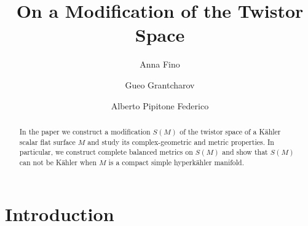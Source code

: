 \documentclass[11pt]{amsart}
\title{On a  Modification of the Twistor Space}
\theoremstyle{definition}
\theoremstyle{plain}
\theoremstyle{definition}
\theoremstyle{plain}
\theoremstyle{remark}
\theoremstyle{plain}
\begin{document}
\author{Anna Fino}
\address[Anna Fino]{Dipartimento di Matematica ``G. Peano'', Universit\`{a} degli studi di Torino \\
Via Carlo Alberto 10\\
10123 Torino, Italy\\
\& Department of Mathematics and Statistics, Florida International University\\
Miami, FL 33199, United States}

\author{Gueo Grantcharov}
\address[Gueo Grantcharov]{Department of Mathematics and Statistics \\
Florida International University\\
Miami, FL 33199, United States
\& Institute of Mathematics and
Informatics, Bulgarian Academy of Sciences\\
 8 Acad. Georgi Bonchev Str. 1113 Sofia, Bulgaria}


\author{Alberto Pipitone Federico}
\address[Alberto Pipitone Federico]{Department of Mathematics \\
University of Tor Vergata\\
Via delle Ricerca Scientifica 1 \\
 00133 Roma, Italy}






\maketitle

\begin{abstract} In the paper we  construct  a modification $S(M)$ of the twistor space of a K\"ahler scalar flat surface $M$ and study its complex-geometric and metric properties.  In particular, we construct complete  balanced metrics on $S(M)$ and show that 
$S(M)$ can not be  K\"ahler when $M$  is a compact  simple  hyperk\"ahler manifold.
 \end{abstract}


\section{Introduction}


\smallskip
\end{document}
